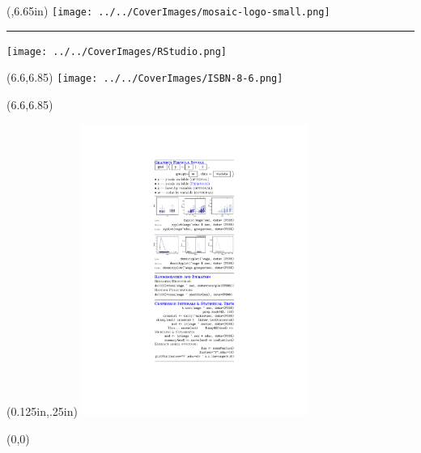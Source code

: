 \documentclass{article}
\newcommand{\trim}{0.125in}
\newlength{\Xlogo}
\begin{document}
\begin{textblock*}{1.5}(\Xlogo,6.65in)  
\noindent\texttt{[image: ../../CoverImages/mosaic-logo-small.png]}
\medskip
\noindent \rule{2pt}{0pt}\texttt{[image: ../../CoverImages/RStudio.png]}
\end{textblock*}


\begin{textblock}{1.65}(6.6,6.85)   %
\noindent\texttt{[image: ../../CoverImages/ISBN-8-6.png]}
\end{textblock}
\begin{textblock}{1.65}(6.6,6.85)
\noindent{}
\end{textblock}



\begin{textblock*}{3}(\trim,.25in)
\noindent\includegraphics[width=2.9in]{backflap.pdf}
\end{textblock*}

\begin{textblock}{3}(0,0)
\noindent{}
\end{textblock}

\end{document}
